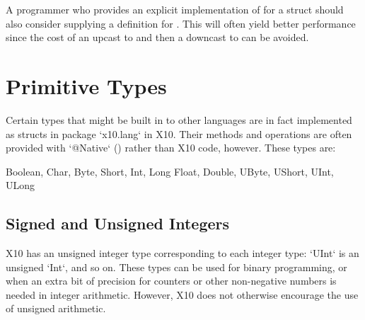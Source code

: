A programmer who provides an explicit implementation
of  for a struct  should also consider
supplying a definition for . This will often
yield better performance since the cost of an upcast to  and
then a downcast to  can be avoided.

\section{Primitive Types}

Certain types that might be built in to other languages are in fact
implemented as structs in package \xcd`x10.lang` in X10. Their methods and
operations are often provided with \xcd`@Native` () rather
than X10 code, however. These types are:
\begin{xten}
Boolean, Char, Byte, Short, Int, Long
Float, Double, UByte, UShort, UInt, ULong
\end{xten}

\subsection{Signed and Unsigned Integers}

X10 has an unsigned integer type corresponding to each integer type:
\xcd`UInt` is an unsigned \xcd`Int`, and so on. These types can be used for
binary programming, or when an extra bit of precision for counters or other
non-negative numbers is needed in integer arithmetic. However, X10 does not
otherwise encourage the use of unsigned arithmetic.




